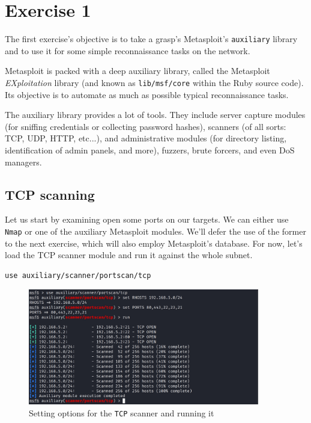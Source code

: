 \section{Exercise 1}
\label{sec:exercise1}

The first exercise's objective is to take a grasp's Metasploit's \texttt{auxiliary} library and to use it for some simple reconnaissance tasks on the network.

Metasploit is packed with a deep auxiliary library, called the Metasploit \textit{EXploitation} library (and known as \texttt{lib}\texttt{/msf}\texttt{/core} within the Ruby source code). Its objective is to automate as much as possible typical reconnaissance tasks.

The auxiliary library provides a lot of tools. They include server capture modules (for sniffing credentials or collecting password hashes), scanners (of all sorts: TCP, UDP, HTTP, etc...), and administrative modules (for directory listing, identification of admin panels, and more), fuzzers, brute forcers, and even DoS managers.

\subsection{TCP scanning}
\label{sec:exercise1:tcpscanning}

Let us start by examining open some ports on our targets. We can either use \texttt{Nmap} or one of the auxiliary Metasploit modules. We'll defer the use of the former to the next exercise, which will also employ Metasploit's database. For now, let's load the TCP scanner module and run it against the whole subnet.\cite{online:msf-scanning-enumeration}\cite{online:msf-auxmodules}

\begin{lstlisting}
use auxiliary/scanner/portscan/tcp
\end{lstlisting}

\begin{figure}[htbp]
	\centering
	\includegraphics[width=0.9\textwidth]{../drawable/exercise_1_screenshots/es1-scan.jpg}
	\caption{Setting options for the \texttt{TCP} scanner and running it}
	\label{fig:ex1:scan}
\end{figure}

